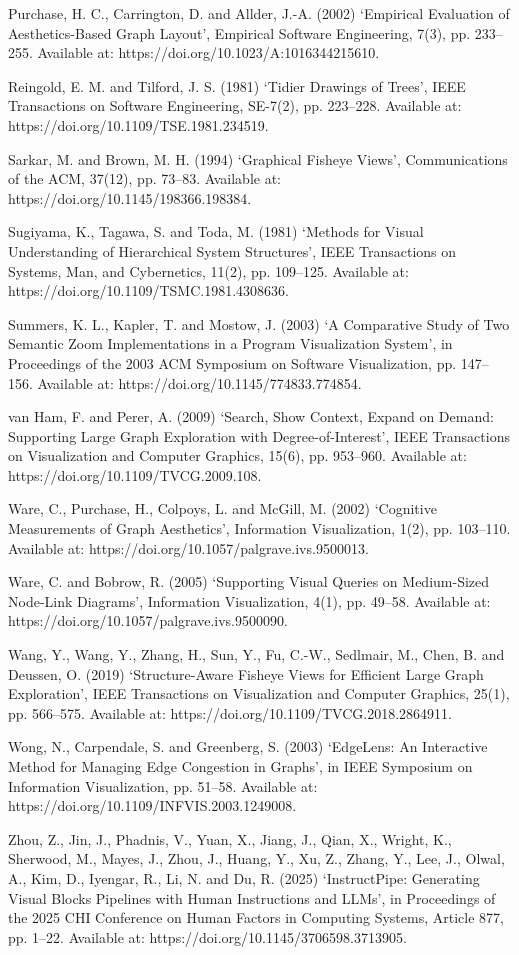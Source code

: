 \documentclass[11pt,a4paper,oneside,extrafontsizes]{memoir}
\begin{document}
Purchase, H. C., Carrington, D. and Allder, J.-A. (2002) ‘Empirical Evaluation of Aesthetics-Based Graph Layout’, Empirical Software Engineering, 7(3), pp. 233–255. Available at: https://doi.org/10.1023/A:1016344215610.

Reingold, E. M. and Tilford, J. S. (1981) ‘Tidier Drawings of Trees’, IEEE Transactions on Software Engineering, SE-7(2), pp. 223–228. Available at: https://doi.org/10.1109/TSE.1981.234519.

Sarkar, M. and Brown, M. H. (1994) ‘Graphical Fisheye Views’, Communications of the ACM, 37(12), pp. 73–83. Available at: https://doi.org/10.1145/198366.198384.

Sugiyama, K., Tagawa, S. and Toda, M. (1981) ‘Methods for Visual Understanding of Hierarchical System Structures’, IEEE Transactions on Systems, Man, and Cybernetics, 11(2), pp. 109–125. Available at: https://doi.org/10.1109/TSMC.1981.4308636.

Summers, K. L., Kapler, T. and Mostow, J. (2003) ‘A Comparative Study of Two Semantic Zoom Implementations in a Program Visualization System’, in Proceedings of the 2003 ACM Symposium on Software Visualization, pp. 147–156. Available at: https://doi.org/10.1145/774833.774854.

van Ham, F. and Perer, A. (2009) ‘Search, Show Context, Expand on Demand: Supporting Large Graph Exploration with Degree-of-Interest’, IEEE Transactions on Visualization and Computer Graphics, 15(6), pp. 953–960. Available at: https://doi.org/10.1109/TVCG.2009.108.

Ware, C., Purchase, H., Colpoys, L. and McGill, M. (2002) ‘Cognitive Measurements of Graph Aesthetics’, Information Visualization, 1(2), pp. 103–110. Available at: https://doi.org/10.1057/palgrave.ivs.9500013.

Ware, C. and Bobrow, R. (2005) ‘Supporting Visual Queries on Medium-Sized Node-Link Diagrams’, Information Visualization, 4(1), pp. 49–58. Available at: https://doi.org/10.1057/palgrave.ivs.9500090.

Wang, Y., Wang, Y., Zhang, H., Sun, Y., Fu, C.-W., Sedlmair, M., Chen, B. and Deussen, O. (2019) ‘Structure-Aware Fisheye Views for Efficient Large Graph Exploration’, IEEE Transactions on Visualization and Computer Graphics, 25(1), pp. 566–575. Available at: https://doi.org/10.1109/TVCG.2018.2864911.

Wong, N., Carpendale, S. and Greenberg, S. (2003) ‘EdgeLens: An Interactive Method for Managing Edge Congestion in Graphs’, in IEEE Symposium on Information Visualization, pp. 51–58. Available at: https://doi.org/10.1109/INFVIS.2003.1249008.

Zhou, Z., Jin, J., Phadnis, V., Yuan, X., Jiang, J., Qian, X., Wright, K., Sherwood, M., Mayes, J., Zhou, J., Huang, Y., Xu, Z., Zhang, Y., Lee, J., Olwal, A., Kim, D., Iyengar, R., Li, N. and Du, R. (2025) ‘InstructPipe: Generating Visual Blocks Pipelines with Human Instructions and LLMs’, in Proceedings of the 2025 CHI Conference on Human Factors in Computing Systems, Article 877, pp. 1–22. Available at: https://doi.org/10.1145/3706598.3713905.
\end{document}
